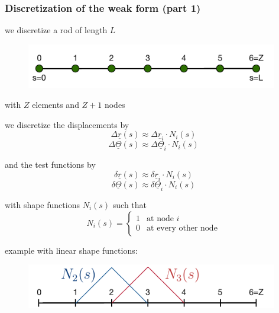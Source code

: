 \begin{frame}
  \frametitle{Discretization of the weak form (part 1)}
  
  \begin{multicols}{2}
    \noindent
    
    we discretize a rod of length $L$
    \begin{figure}
      \centering
      \includegraphics[width=11cm, keepaspectratio=true]{sections/cosserat_rods/images/DiscretizationWeakFormNodes}
    \end{figure}
    with $Z$ elements and $Z+1$ nodes
    
    \vspace{0.7em}
    we discretize the displacements by
    \begin{displaymath}
      \Delta \underline{r}(s) \approx \Delta \underline{r}_i \cdot N_i(s)
    \end{displaymath}
    \begin{displaymath}
      \Delta \underline{\Theta}(s) \approx \Delta \underline{\Theta}_i \cdot N_i(s)
    \end{displaymath}
    
    \vspace{0.5em}
    and the test functions by
    \begin{displaymath}
      \delta \underline{r}(s) \approx \delta \underline{r}_i \cdot N_i(s)
    \end{displaymath}
    \begin{displaymath}
      \delta \underline{\Theta}(s) \approx \delta \underline{\Theta}_i \cdot N_i(s)
    \end{displaymath}
    
    \vspace{1em}
    with shape functions $N_i(s)$ such that
    \begin{displaymath}
      N_i(s) =
      \begin{cases}
        1 & \text{at node } i \\
        0 & \text{at every other node}
      \end{cases}
    \end{displaymath}
    
    \vspace{1em}
    example with linear shape functions:
    \begin{figure}
      \centering
      \includegraphics[width=11cm, keepaspectratio=true]{sections/cosserat_rods/images/DiscretizationWeakFormShapeFunction}
    \end{figure}
    

\end{multicols}
\end{frame}
